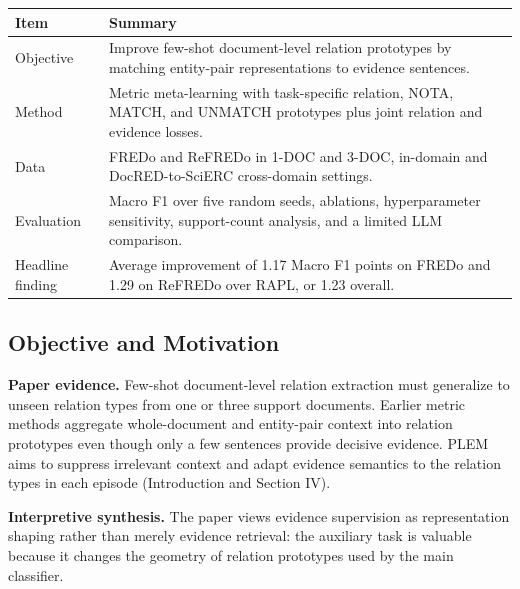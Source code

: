 \documentclass[11pt]{article}
\newcounter{none} %
\begin{document}
{\def\LTcaptype{none} %
\begin{longtable}[]{@{}
  >{\raggedright\arraybackslash}p{}
  >{\raggedright\arraybackslash}p{}@{}}
\toprule\noalign{}
\begin{minipage}[b]{\linewidth}\centering
\textbf{Item}
\end{minipage} & \begin{minipage}[b]{\linewidth}\centering
\textbf{Summary}
\end{minipage} \\
\midrule\noalign{}
\endhead
\bottomrule\noalign{}
\endlastfoot
Objective & Improve few-shot document-level relation prototypes by
matching entity-pair representations to evidence sentences. \\
Method & Metric meta-learning with task-specific relation, NOTA, MATCH,
and UNMATCH prototypes plus joint relation and evidence losses. \\
Data & FREDo and ReFREDo in 1-DOC and 3-DOC, in-domain and
DocRED-to-SciERC cross-domain settings. \\
Evaluation & Macro F1 over five random seeds, ablations, hyperparameter
sensitivity, support-count analysis, and a limited LLM comparison. \\
Headline finding & Average improvement of 1.17 Macro F1 points on FREDo
and 1.29 on ReFREDo over RAPL, or 1.23 overall. \\
\end{longtable}
}

\subsection{Objective and Motivation}\label{objective-and-motivation-2}

\textbf{Paper evidence.} Few-shot document-level relation extraction must generalize to
unseen relation types from one or three support documents. Earlier
metric methods aggregate whole-document and entity-pair context into
relation prototypes even though only a few sentences provide decisive
evidence. PLEM aims to suppress irrelevant context and adapt evidence
semantics to the relation types in each episode (Introduction and
Section IV).

\textbf{Interpretive synthesis.} The paper views evidence supervision as representation
shaping rather than merely evidence retrieval: the auxiliary task is
valuable because it changes the geometry of relation prototypes used by
the main classifier.
\end{document}
